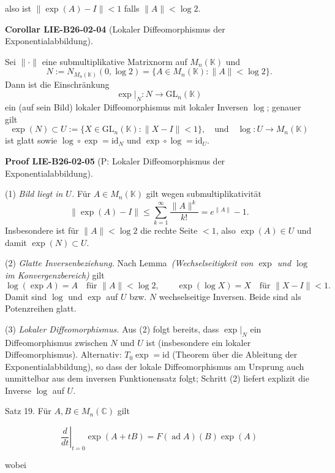 \documentclass[10pt, letterpaper]{article}
\newcommand{\CustomHeading}[3]{%
  \par\medskip\noindent%
  \textbf{#1 #2} \textnormal{(#3)}.\enskip%
}
\newenvironment{KORO}[2]{\begin{unitbox}\CustomHeading{Corollar}{#1}{#2}}{\end{unitbox}}
\newenvironment{PROOF}[2]{\begin{unitbox}\CustomHeading{Proof}{#1}{#2}}{\end{unitbox}}
\begin{document}
also ist $\|\exp (A)-I\|<1$ falls $\|A\|<\log 2$.\\



\begin{KORO}{LIE-B26-02-04}{Lokaler Diffeomorphismus der Exponentialabbildung}
Sei $\|\cdot\|$ eine submultiplikative Matrixnorm auf $M_n(\mathbb{K})$ und
\[
N := N_{M_n(\mathbb{K})}(0,\log 2)=\{A\in M_n(\mathbb{K}): \|A\|<\log 2\}.
\]
Dann ist die Einschränkung
\[
\exp\big|_{N} : N \longrightarrow \mathrm{GL}_n(\mathbb{K})
\]
ein (auf sein Bild) lokaler Diffeomorphismus mit lokaler Inversen $\log$; genauer gilt
\[
\exp(N)\subset U:=\{X\in \mathrm{GL}_n(\mathbb{K}) : \|X-I\|<1\},
\quad\text{und}\quad
\log:U\to M_n(\mathbb{K})
\]
ist glatt sowie $\log\circ\exp=\mathrm{id}_{N}$ und $\exp\circ\log=\mathrm{id}_{U}$.
\end{KORO}


\begin{PROOF}{LIE-B26-02-05}{P: Lokaler Diffeomorphismus der Exponentialabbildung}
(1) \textit{Bild liegt in $U$.} Für $A\in M_n(\mathbb{K})$ gilt wegen submultiplikativität
\[
\|\exp(A)-I\| \le \sum_{k=1}^\infty \frac{\|A\|^k}{k!} = e^{\|A\|}-1.
\]
Insbesondere ist für $\|A\|<\log 2$ die rechte Seite $<1$, also $\exp(A)\in U$ und damit $\exp(N)\subset U$.

(2) \textit{Glatte Inversenbeziehung.} Nach Lemma~\textit{(Wechselseitigkeit von $\exp$ und $\log$ im Konvergenzbereich)} gilt
\[
\log(\exp A)=A \quad\text{für }\|A\|<\log 2,
\qquad
\exp(\log X)=X \quad\text{für }\|X-I\|<1.
\]
Damit sind $\log$ und $\exp$ auf $U$ bzw. $N$ wechselseitige Inversen. Beide sind als Potenzreihen glatt.

(3) \textit{Lokaler Diffeomorphismus.} Aus (2) folgt bereits, dass $\exp\big|_{N}$ ein Diffeomorphismus zwischen $N$ und $U$ ist (insbesondere ein lokaler Diffeomorphismus). Alternativ: $T_{0}\exp=\mathrm{id}$ (Theorem über die Ableitung der Exponentialabbildung), so dass der lokale Diffeomorphismus am Ursprung auch unmittelbar aus dem inversen Funktionensatz folgt; Schritt (2) liefert explizit die Inverse $\log$ auf $U$.
\end{PROOF}





Satz 19. Für $A, B \in M_{n}(\mathbb{C})$ gilt

$$
\left.\frac{d}{d t}\right|_{t=0} \exp (A+t B)=F(\operatorname{ad} A)(B) \exp (A)
$$

wobei
\end{document}
